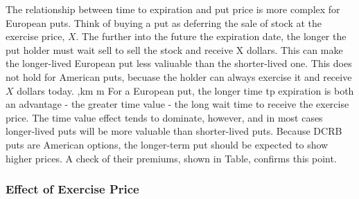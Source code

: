 \documentclass{book}
\theoremstyle{definition}
\theoremstyle{remark}
\begin{document}
            The relationship between time to expiration and put price is more complex for European puts. Think of buying a put as deferring the sale of stock at the exercise price, $X$. The further into the future the expiration date, the longer the put holder must wait sell to sell the stock and receive X dollars. This can make the longer-lived European put less valiuable than the shorter-lived one. This does not hold for American puts, becuase the holder can always exercise it and receive $X$ dollars today. 
            ,km m
            For a European put, the longer time tp expiration is both an advantage - the greater time value - the long wait time to receive the exercise price. The time value effect tends to dominate, however, and in most cases longer-lived puts will be more valuable than shorter-lived puts. Because DCRB puts are American options, the longer-term put should be expected to show higher prices. A check of their premiums, shown in Table, confirms this point.
        
        \subsubsection{Effect of Exercise Price}
            
\end{document}

